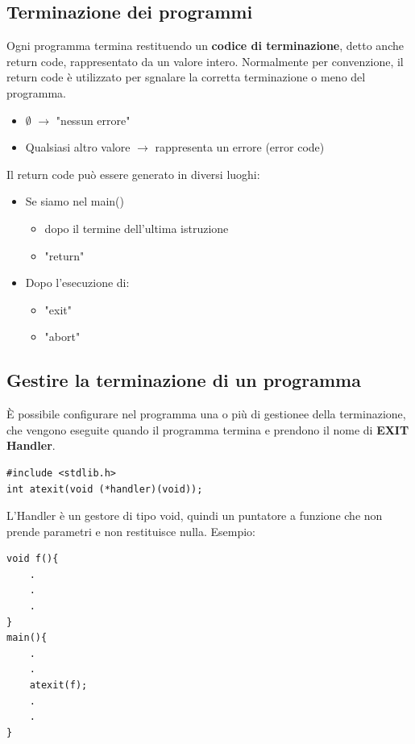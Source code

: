 \subsection{Terminazione dei programmi}
Ogni programma termina restituendo un \textbf{codice di terminazione},
detto anche return code, rappresentato da un valore intero. Normalmente
per convenzione, il return code è utilizzato per sgnalare la corretta terminazione
o meno del programma.
\begin{itemize}
    \item $\emptyset$ $\rightarrow$ "nessun errore"
    \item Qualsiasi altro valore $\rightarrow$ rappresenta un errore (error code)
\end{itemize}
Il return code può essere generato in diversi luoghi:
\begin{itemize}
    \item Se siamo nel main()
    \begin{itemize}
        \item dopo il termine dell'ultima istruzione
        \item "return"
    \end{itemize}
    \item Dopo l'esecuzione di: 
    \begin{itemize}
        \item "exit"
        \item "abort"
    \end{itemize}
\end{itemize}
\subsection{Gestire la terminazione di un programma}
È possibile configurare nel programma una o più di gestionee della terminazione, che vengono eseguite quando il programma termina
e prendono il nome di \textbf{EXIT Handler}.
\begin{verbatim}
#include <stdlib.h>
int atexit(void (*handler)(void));
\end{verbatim}
L'Handler è un gestore di tipo void, quindi un puntatore a funzione che non prende parametri e non restituisce nulla. Esempio:
\begin{verbatim}
void f(){
    .
    .
    .
}
main(){
    .
    .
    atexit(f);
    .
    .
}
\end{verbatim}
